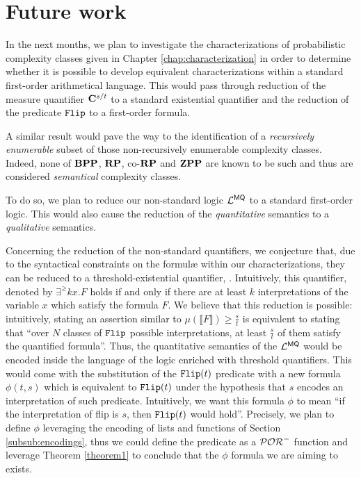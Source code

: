 \section{Future work}

In the next months, we plan to investigate the characterizations of probabilistic
complexity classes given in Chapter \ref{chap:characterization} in order to determine whether
it is possible to develop equivalent characterizations within
a standard first-order arithmetical language. This would pass through
reduction of the measure quantifier $\mathbf{C}^{s/t}$ to a standard existential quantifier
and the reduction of the predicate $\mathtt{Flip}$ to a first-order formula.

A similar result would pave the way to the identification of a \emph{recursively enumerable} subset
of those non-recursively enumerable complexity classes. Indeed, none of $\mathbf{BPP}$, $\mathbf{RP}$,
co-$\mathbf{RP}$ and $\mathbf{ZPP}$ are known to be such and thus are considered
\emph{semantical} complexity classes.

To do so, we plan to reduce our non-standard logic $\mathcal{L}^{\mathsf{MQ}}$
to a standard first-order logic.
This would also cause the reduction of the \emph{quantitative} semantics
to a \emph{qualitative} semantics.

Concerning the reduction of the non-standard quantifiers, we conjecture that,
due to the syntactical constraints on
the formul\ae{} within our characterizations, they
can be reduced to a threshold-existential quantifier, \cite{Gradel}.
Intuitively, this quantifier, denoted by $\exists^\ge{k}x. F$
holds if and only if there are at least $k$ interpretations of the variable $x$
which satisfy the formula $F$. We believe that this reduction is possible:
intuitively, stating
an assertion similar to
$\mu(\llbracket F \rrbracket)\ge \frac s t$ is equivalent to stating that
``over $N$ classes of $\mathtt{Flip}$ possible interpretations, at least $\frac s t$
of them satisfy the quantified formula''. Thus, the quantitative semantics of the
$\mathcal{L}^{\mathsf{MQ}}$ would be encoded inside the language of the logic enriched with threshold quantifiers.
This would come with the substitution of the $\mathtt{Flip}(t)$ predicate with a new formula
$\phi(t, s)$ which is equivalent to $\mathtt{Flip}(t)$
under the hypothesis that $s$ encodes an interpretation of such
predicate.
%
Intuitively, we want this formula $\phi$ to mean
``if the interpretation of flip is $s$, then $\mathtt{Flip}(t)$ would hold''.
%
Precisely, we plan to define $\phi$ leveraging the encoding of
lists and functions of Section \ref{subsub:encodings}, thus we could define
the predicate as a $\mathcal{POR}^-$ function and leverage Theorem \ref{theorem1}
to conclude that the $\phi$ formula we are aiming to exists.

